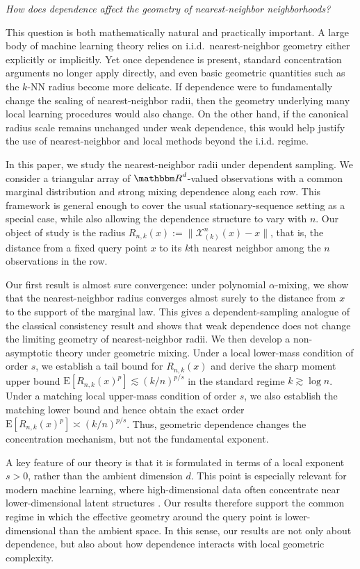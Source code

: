 \documentclass[12pt]{article}
\def\E{{\mathrm E}}
\def\R{{\mathbbm R}}
\theoremstyle{definition}
\begin{document}
\begin{center}
\emph{How does dependence affect the geometry of nearest-neighbor neighborhoods?}
\end{center}

This question is both mathematically natural and practically important. A large body of machine learning theory relies on i.i.d.\ nearest-neighbor geometry either explicitly or implicitly. Yet once dependence is present, standard concentration arguments no longer apply directly, and even basic geometric quantities such as the $k$-NN radius become more delicate. If dependence were to fundamentally change the scaling of nearest-neighbor radii, then the geometry underlying many local learning procedures would also change. On the other hand, if the canonical radius scale remains unchanged under weak dependence, this would help justify the use of nearest-neighbor and local methods beyond the i.i.d. regime.

In this paper, we study the nearest-neighbor radii under dependent sampling. We consider a triangular array of $\R^d$-valued observations with a common marginal distribution and strong mixing dependence along each row. This framework is general enough to cover the usual stationary-sequence setting as a special case, while also allowing the dependence structure to vary with $n$. Our object of study is the radius $R_{n,k}(x) := \| \mathcal X_{(k)}^n(x)-x\|$,
that is, the distance from a fixed query point $x$ to its $k$th nearest neighbor among the $n$ observations in the row.

Our first result is almost sure convergence: under polynomial $\alpha$-mixing, we show that the nearest-neighbor radius converges almost surely to the distance from $x$ to the support of the marginal law. This gives a dependent-sampling analogue of the classical consistency result and shows that weak dependence does not change the limiting geometry of nearest-neighbor radii. We then develop a non-asymptotic theory under geometric mixing. Under a local lower-mass condition of order $s$, we establish a tail bound for $R_{n,k}(x)$ and derive the sharp moment upper bound $\E[R_{n,k}(x)^p] \lesssim (k/n)^{p/s}$ in the standard regime $k \gtrsim \log n$. Under a matching local upper-mass condition of order $s$, we also establish the matching lower bound and hence obtain the exact order $\E[R_{n,k}(x)^p] \asymp (k/n)^{p/s}$. Thus, geometric dependence changes the concentration mechanism, but not the fundamental exponent.

A key feature of our theory is that it is formulated in terms of a local exponent $s>0$, rather than the ambient dimension $d$. This point is especially relevant for modern machine learning, where high-dimensional data often concentrate near lower-dimensional latent structures \citep{fefferman2016testing,ansuini2019intrinsic}. Our results therefore support the common regime in which the effective geometry around the query point is lower-dimensional than the ambient space. In this sense, our results are not only about dependence, but also about how dependence interacts with local geometric complexity.
\end{document}
